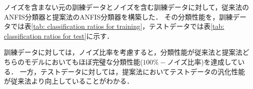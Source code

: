 \documentclass[twoside,twocolumn]{ujarticle}
\begin{document}

ノイズを含まない元の訓練データとノイズを含む訓練データに対して，従来法のANFIS分類器と提案法のANFIS分類器を構築した．
その分類性能を，訓練データでは表\ref{tab: classification ratios for training}，テストデータでは表\ref{tab: classification ratios for test}に示す．

\begin{table}[!ht]
	\caption{訓練データに対する分類性能の比較}
	\label{tab: classification ratios for training}
	\centering
\end{table}

\begin{table}[!ht]
	\caption{テストデータに対する分類性能の比較}
	\label{tab: classification ratios for test}
	\centering
\end{table}

訓練データに対しては，ノイズ比率を考慮すると，分類性能が従来法と提案法どちらのモデルにおいてもほぼ完璧な分類性能($100\%-$ノイズ比率)を達成している．
一方，テストデータに対しては，提案法においてテストデータの汎化性能が従来法より向上していることがわかる．
\end{document}
